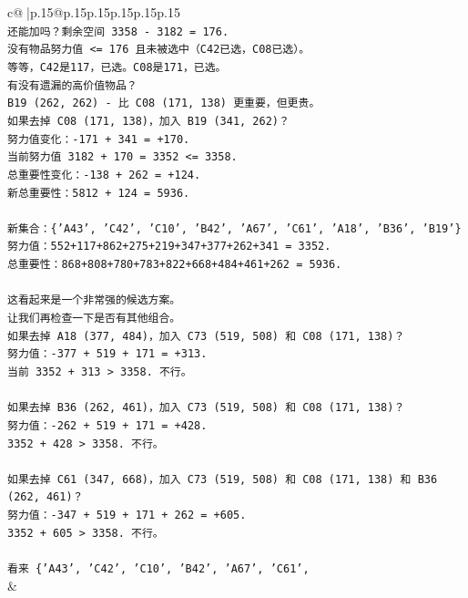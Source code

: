 \documentclass{article}
\begin{document}
{\begin{supertabular}{c@{$\;$}|p{.15\linewidth}@{}p{.15\linewidth}p{.15\linewidth}p{.15\linewidth}p{.15\linewidth}p{.15\linewidth}}
{{{\\ 
\texttt{还能加吗？剩余空间 3358 {-} 3182 = 176.} \\
\texttt{没有物品努力值 <= 176 且未被选中（C42已选，C08已选）。} \\
\texttt{等等，C42是117，已选。C08是171，已选。} \\
\texttt{有没有遗漏的高价值物品？} \\
\texttt{B19 (262, 262) {-} 比 C08 (171, 138) 更重要，但更贵。} \\
\texttt{如果去掉 C08 (171, 138)，加入 B19 (341, 262)？} \\
\texttt{努力值变化：{-}171 + 341 = +170.} \\
\texttt{当前努力值 3182 + 170 = 3352 <= 3358.} \\
\texttt{总重要性变化：{-}138 + 262 = +124.} \\
\texttt{新总重要性：5812 + 124 = 5936.} \\
\\ 
\texttt{新集合：\{'A43', 'C42', 'C10', 'B42', 'A67', 'C61', 'A18', 'B36', 'B19'\}} \\
\texttt{努力值：552+117+862+275+219+347+377+262+341 = 3352.} \\
\texttt{总重要性：868+808+780+783+822+668+484+461+262 = 5936.} \\
\\ 
\texttt{这看起来是一个非常强的候选方案。} \\
\texttt{让我们再检查一下是否有其他组合。} \\
\texttt{如果去掉 A18 (377, 484)，加入 C73 (519, 508) 和 C08 (171, 138)？} \\
\texttt{努力值：{-}377 + 519 + 171 = +313.} \\
\texttt{当前 3352 + 313 > 3358. 不行。} \\
\\ 
\texttt{如果去掉 B36 (262, 461)，加入 C73 (519, 508) 和 C08 (171, 138)？} \\
\texttt{努力值：{-}262 + 519 + 171 = +428.} \\
\texttt{3352 + 428 > 3358. 不行。} \\
\\ 
\texttt{如果去掉 C61 (347, 668)，加入 C73 (519, 508) 和 C08 (171, 138) 和 B36 (262, 461)？} \\
\texttt{努力值：{-}347 + 519 + 171 + 262 = +605.} \\
\texttt{3352 + 605 > 3358. 不行。} \\
\\ 
\texttt{看来 \{'A43', 'C42', 'C10', 'B42', 'A67', 'C61',} \\
            }
        }
    }
    & \\ \\


\end{supertabular}}
\end{document}
